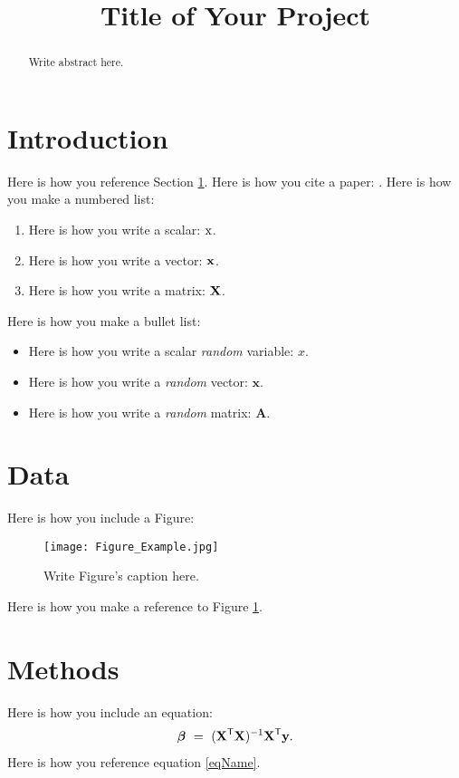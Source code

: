 \documentclass[conference]{IEEEtran}
\def \X{\boldsymbol{\rm X}}
\def \y{\boldsymbol{\rm y}}
\def \bbeta{\boldsymbol{\beta}}
\def \T{\mathsf{T}}
\begin{document}
\title{Title of Your Project}
\author{
}
\maketitle

\begin{abstract}
Write abstract here.
\end{abstract}



\section{Introduction}
\label{secName}
Here is how you reference Section \ref{secName}. Here is how you cite a paper: \cite{paperName}. Here is how you make a numbered list:
\begin{enumerate}
\item
Here is how you write a scalar: ${\rm x}$.
\item
Here is how you write a vector: $\boldsymbol{\rm x}$.
\item
Here is how you write a matrix: $\boldsymbol{\rm X}$.
\end{enumerate}

Here is how you make a bullet list:
\begin{itemize}
\item
Here is how you write a scalar {\em random} variable: $x$.
\item
Here is how you write a {\em random} vector: $\boldsymbol{x}$.
\item
Here is how you write a {\em random} matrix: $\boldsymbol{A}$.
\end{itemize}

\section{Data}
Here is how you include a Figure:
\begin{figure}[h]
\centering
\texttt{[image: Figure\_Example.jpg]}
\caption{Write Figure's caption here.}
\label{figName}
\end{figure}

Here is how you make a reference to Figure \ref{figName}.

\section{Methods}
Here is how you include an equation:
\begin{align}
\label{eqName}
\bbeta \ = \ (\X^\T\X)^{-1}\X^\T\y.
\end{align}
Here is how you reference equation \eqref{eqName}.
\end{document}

